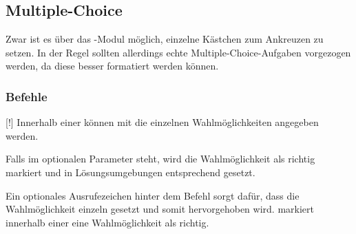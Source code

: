 \subsection{Multiple-Choice}
Zwar ist es über das -Modul möglich, einzelne Kästchen zum Ankreuzen zu setzen. In der Regel sollten allerdings echte Multiple-Choice-Aufgaben vorgezogen werden, da diese besser formatiert werden können.%

\subsubsection{Befehle}
\begin{commands}
    [!] Innerhalb einer  können mit  die einzelnen Wahlmöglichkeiten angegeben werden.

        Falls im optionalen Parameter  steht, wird die Wahlmöglichkeit als richtig markiert und in Lösungsumgebungen entsprechend gesetzt.

        Ein optionales Ausrufezeichen hinter dem Befehl sorgt dafür, dass die Wahlmöglichkeit einzeln gesetzt und somit hervorgehoben wird.
     markiert innerhalb einer  eine Wahlmöglichkeit als richtig.

%
\end{commands}

